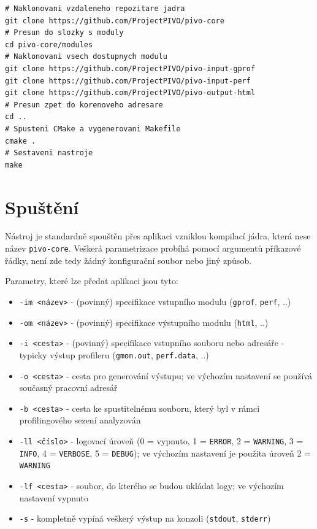 \documentclass[czech,BP]{thesiskiv}
\begin{document}
\lstset{escapechar=@,style=custombash}
\begin{lstlisting}
# Naklonovani vzdaleneho repozitare jadra
git clone https://github.com/ProjectPIVO/pivo-core
# Presun do slozky s moduly
cd pivo-core/modules
# Naklonovani vsech dostupnych modulu
git clone https://github.com/ProjectPIVO/pivo-input-gprof
git clone https://github.com/ProjectPIVO/pivo-input-perf
git clone https://github.com/ProjectPIVO/pivo-output-html
# Presun zpet do korenoveho adresare
cd ..
# Spusteni CMake a vygenerovani Makefile
cmake .
# Sestaveni nastroje
make
\end{lstlisting}


\section{Spuštění}

Nástroj je standardně spouštěn přes aplikaci vzniklou kompilací jádra, která nese název \texttt{pivo-core}. Veškerá parametrizace probíhá pomocí argumentů příkazové řádky, není zde tedy žádný konfigurační soubor nebo jiný způsob.

Parametry, které lze předat aplikaci jsou tyto:

\begin{itemize}
\item \texttt{-im <název>} - (povinný) specifikace vstupního modulu (\texttt{gprof}, \texttt{perf}, ..)
\item \texttt{-om <název>} - (povinný) specifikace výstupního modulu (\texttt{html}, ..)
\item \texttt{-i <cesta>} - (povinný) specifikace vstupního souboru nebo adresáře - typicky výstup profileru (\texttt{gmon.out}, \texttt{perf.data}, ..)
\item \texttt{-o <cesta>} - cesta pro generování výstupu; ve výchozím nastavení se používá současný pracovní adresář
\item \texttt{-b <cesta>} - cesta ke spustitelnému souboru, který byl v rámci profilingového sezení analyzován
\item \texttt{-ll <číslo>} - logovací úroveň (0 = vypnuto, 1 = \texttt{ERROR}, 2 = \texttt{WARNING}, 3 = \texttt{INFO}, 4 = \texttt{VERBOSE}, 5 = \texttt{DEBUG}); ve výchozím nastavení je použita úroveň 2 = \texttt{WARNING}
\item \texttt{-lf <cesta>} - soubor, do kterého se budou ukládat logy; ve výchozím nastavení vypnuto
\item \texttt{-s} - kompletně vypíná veškerý výstup na konzoli (\texttt{stdout}, \texttt{stderr})
\end{itemize}
\end{document}
